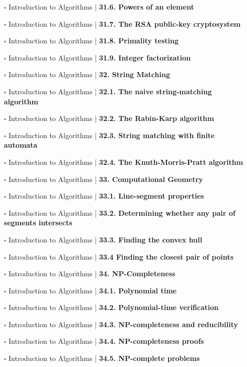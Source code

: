 \documentclass[a4, landscape, 12pt]{article}
\newcommand{\checkbox}{$\square$}%
\begin{document}
\begin{itemize}
{}
\item [\checkbox]  Introduction to Algorithms | \textbf{ 31.6. Powers of an element
}
\item [\checkbox]  Introduction to Algorithms | \textbf{ 31.7. The RSA public-key cryptosystem
}
\item [\checkbox]  Introduction to Algorithms | \textbf{ 31.8. Primality testing
}
\item [\checkbox]  Introduction to Algorithms | \textbf{ 31.9. Integer factorization
}
\item [\checkbox]  Introduction to Algorithms | \textbf{ 32. String Matching
}
\item [\checkbox]  Introduction to Algorithms | \textbf{ 32.1. The naive string-matching algorithm
}
\item [\checkbox]  Introduction to Algorithms | \textbf{ 32.2. The Rabin-Karp algorithm
}
\item [\checkbox]  Introduction to Algorithms | \textbf{ 32.3. String matching with finite automata
}
\item [\checkbox]  Introduction to Algorithms | \textbf{ 32.4. The Knuth-Morris-Pratt algorithm
}
\item [\checkbox]  Introduction to Algorithms | \textbf{ 33. Computational Geometry
}
\item [\checkbox]  Introduction to Algorithms | \textbf{ 33.1. Line-segment properties
}
\item [\checkbox]  Introduction to Algorithms | \textbf{ 33.2. Determining whether any pair of segments intersects
}
\item [\checkbox]  Introduction to Algorithms | \textbf{ 33.3. Finding the convex hull
}
\item [\checkbox]  Introduction to Algorithms | \textbf{ 33.4 Finding the closest pair of points
}
\item [\checkbox]  Introduction to Algorithms | \textbf{ 34. NP-Completeness
}
\item [\checkbox]  Introduction to Algorithms | \textbf{ 34.1. Polynomial time
}
\item [\checkbox]  Introduction to Algorithms | \textbf{ 34.2. Polynomial-time verification
}
\item [\checkbox]  Introduction to Algorithms | \textbf{ 34.3. NP-completeness and reducibility
}
\item [\checkbox]  Introduction to Algorithms | \textbf{ 34.4. NP-completeness proofs
}
\item [\checkbox]  Introduction to Algorithms | \textbf{ 34.5. NP-complete problems
}
\end{itemize}
\end{document}
